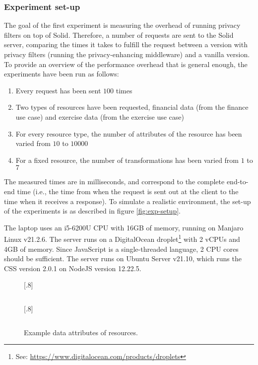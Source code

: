 \subsubsection{Experiment set-up}
The goal of the first experiment is measuring the overhead of running privacy filters on top of Solid. Therefore, a number of requests are sent to the Solid server, comparing the times it takes to fulfill the request between a version with privacy filters (running the privacy-enhancing middleware) and a vanilla version. To provide an overview of the performance overhead that is general enough, the experiments have been run as follows:
\begin{enumerate}
    \item Every request has been sent $100$ times
    \item Two types of resources have been requested, financial data (from the finance use case) and exercise data (from the exercise use case)
    \item For every resource type, the number of attributes of the resource has been varied from $10$ to $10 000$
    \item For a fixed resource, the number of transformations has been varied from $1$ to $7$
\end{enumerate}

\noindent The measured times are in milliseconds, and correspond to the complete end-to-end time (i.e., the time from when the request is sent out at the client to the time when it receives a response). To simulate a realistic environment, the set-up of the experiments is as described in figure \ref{fig:exp-setup}.

\noindent 

\noindent The laptop uses an i5-6200U CPU with 16GB of memory, running on Manjaro Linux v21.2.6. The server runs on a DigitalOcean droplet\footnote{See: \url{https://www.digitalocean.com/products/droplets}} with 2 vCPUs and 4GB of memory. Since JavaScript is a single-threaded language, 2 CPU cores should be sufficient. The server runs on Ubuntu Server v21.10, which runs the \acrlong{CSS} version 2.0.1 on NodeJS version 12.22.5.

\begin{figure}[H]
\centering
{}%
  [.8\textwidth]{\inputminted[linenos,tabsize=2,breaklines]{json}{code/ex-attr-txdata.json}}
  [.8\textwidth]{ \inputminted[linenos,tabsize=2]{xml}{code/ex-attr-tcx.xml}}
\caption{Example data attributes of resources.}
\label{fig:example-attributes}
\end{figure}

